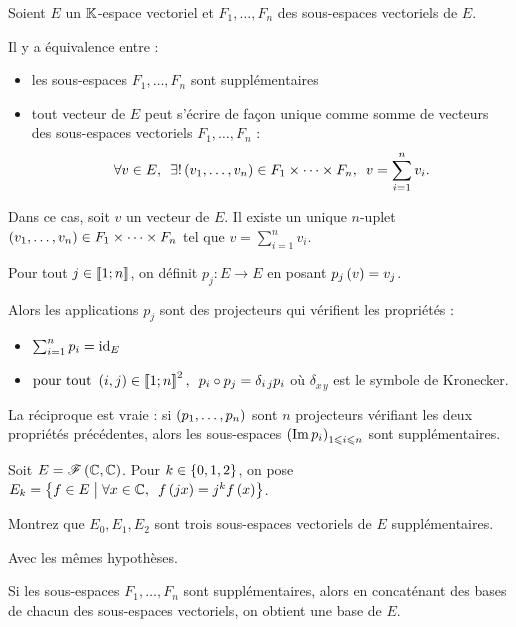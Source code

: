 \begin{prop}
Soient \(E\) un \(\mathbb{K}\)-espace vectoriel et \(F_1,\dots,F_n\) des sous-espaces vectoriels de \(E\).

Il y a équivalence entre :

\begin{itemize}
    \item les sous-espaces \(F_1,\dots,F_n\) sont supplémentaires \\
    \item tout vecteur de \(E\) peut s'écrire de façon unique comme somme de vecteurs des sous-espaces vectoriels \(F_1,\dots,F_n\) : \[\quantifs{\forall v\in E;\exists!\paren{v_1,\dots,v_n}\in F_1\times\dots\times F_n}v=\sum_{i=1}^nv_i.\]
\end{itemize}
\end{prop}

Dans ce cas, soit \(v\) un vecteur de \(E\). Il existe un unique \(n\)-uplet \(\left(v_1,\dots,v_n\right)\in F_1\times\dots\times F_n\) tel que \(v=\sum_{i=1}^nv_i\).

Pour tout \(j\in\left\llbracket1;n\right\rrbracket\), on définit \(p_j:E\to E\) en posant \(p_j\left(v\right)=v_j\).

Alors les applications \(p_j\) sont des projecteurs qui vérifient les propriétés :

\begin{itemize}
    \item \(\sum_{i=1}^np_i=\mathrm{id}_{E}\) \\
    \item \(\quantifs{\tpt\paren{i,j}\in\interventierii{1}{n}^2}p_i\rond p_j=\delta_{i\,j}p_i\) où \(\delta_{x\,y}\) est le symbole de Kronecker.
\end{itemize}

La réciproque est vraie : si \(\left(p_1,\dots,p_n\right)\) sont \(n\) projecteurs vérifiant les deux propriétés précédentes, alors les sous-espaces \(\left(\operatorname{Im} p_i\right)_{1\leqslant i\leqslant n}\) sont supplémentaires.

\begin{exo}
Soit \(E=\mathscr{F}\left(\mathbb{C},\mathbb{C}\right)\). Pour \(k\in\left\lbrace0,1,2\right\rbrace\), on pose \(E_k=\accol{f\in E\tq\quantifs{\forall x\in\C}f\paren{jx}=j^kf\paren{x}}\).

Montrez que \(E_0,E_1,E_2\) sont trois sous-espaces vectoriels de \(E\) supplémentaires.
\end{exo}

\begin{prop}
Avec les mêmes hypothèses.

Si les sous-espaces \(F_1,\dots,F_n\) sont supplémentaires, alors en concaténant des bases de chacun des sous-espaces vectoriels, on obtient une base de \(E\).
\end{prop}

